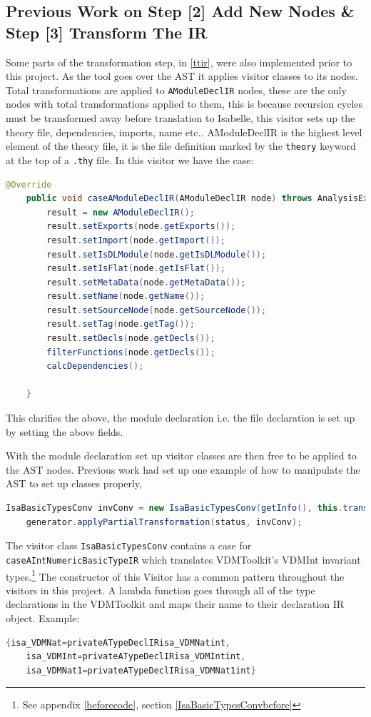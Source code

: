 	
	\subsection{Previous Work on Step [2] Add New Nodes \& Step [3] Transform The IR} \label{pwos}

	Some parts of the transformation step, in \ref{ttir}, were also implemented prior to this project.	As the tool goes over the AST it applies visitor classes to its nodes. Total transformations are applied to \lstinline[language=Java]{AModuleDeclIR} nodes, these are the only nodes with total transformations applied to them, this is because recursion cycles must be transformed away before translation to Isabelle, this visitor sets up the theory file, dependencies, imports, name etc.. AModuleDeclIR is the highest level element of the theory file, it is the file definition marked by the \lstinline[language=Isabelle]{theory} keyword at the top of a \lstinline[language=Isabelle]{.thy} file. In this visitor we have the case: 
	\begin{lstlisting}[language=Java]
	@Override
    public void caseAModuleDeclIR(AModuleDeclIR node) throws AnalysisException {
        result = new AModuleDeclIR();
        result.setExports(node.getExports());
        result.setImport(node.getImport());
        result.setIsDLModule(node.getIsDLModule());
        result.setIsFlat(node.getIsFlat());
        result.setMetaData(node.getMetaData());
        result.setName(node.getName());
        result.setSourceNode(node.getSourceNode());
        result.setTag(node.getTag());
        result.setDecls(node.getDecls());
        filterFunctions(node.getDecls());
        calcDependencies();

    }
    \end{lstlisting}
    This clarifies the above, the module declaration i.e. the file declaration is set up by setting the above fields.

    With the module declaration set up visitor classes are then free to be applied to the AST nodes. Previous work had set up one example of how to manipulate the AST to set up classes properly, 
    \begin{lstlisting}[language=Java]
    IsaBasicTypesConv invConv = new IsaBasicTypesConv(getInfo(), this.transAssistant, vdmToolkitModuleIR);
    generator.applyPartialTransformation(status, invConv);
    \end{lstlisting}
    The visitor class \lstinline[language=Java]{IsaBasicTypesConv} contains a case for \lstinline[language=Java]{caseAIntNumericBasicTypeIR} which translates VDMToolkit's VDMInt invariant types.\footnote{See appendix \ref{beforecode}, section \ref{IsaBasicTypesConvbefore}} The constructor of this Visitor has a common pattern throughout the visitors in this project. A lambda function goes through all of the type declarations in the VDMToolkit and maps their name to their declaration IR object. Example: 
	\begin{lstlisting}[language=Java]
	{isa_VDMNat=privateATypeDeclIRisa_VDMNatint,  
	isa_VDMInt=privateATypeDeclIRisa_VDMIntint, 
	isa_VDMNat1=privateATypeDeclIRisa_VDMNat1int}
	\end{lstlisting}

